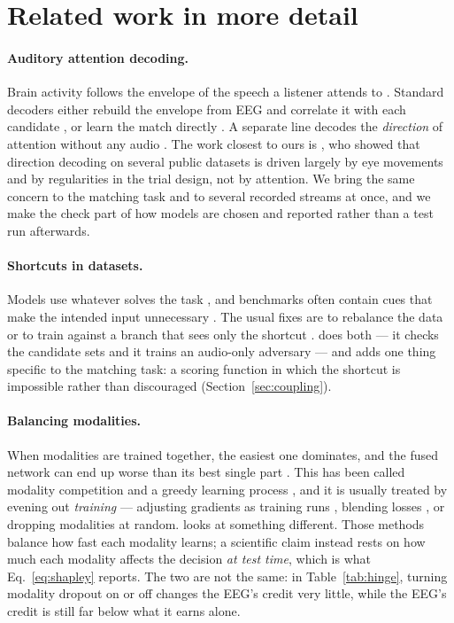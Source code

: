 \section{Related work in more detail}
\label{app:related}

\paragraph{Auditory attention decoding.}
Brain activity follows the envelope of the speech a listener attends to
\citep{ding2012,lalor2009}. Standard decoders either rebuild the envelope from
EEG and correlate it with each candidate \citep{osullivan2015}, or learn the
match directly \citep{accou2021,monesi2020,accou2023,puffay2023}. A separate line
decodes the \emph{direction} of attention without any audio
\citep{vandecappelle2021}. The work closest to ours is \citet{rotaru2024}, who
showed that direction decoding on several public datasets is driven largely by
eye movements and by regularities in the trial design, not by attention. We bring
the same concern to the matching task and to several recorded streams at once,
and we make the check part of how models are chosen and reported rather than a
test run afterwards.

\paragraph{Shortcuts in datasets.}
Models use whatever solves the task \citep{geirhos2020}, and benchmarks often
contain cues that make the intended input unnecessary
\citep{torralba2011,gururangan2018,goyal2017vqa}. The usual fixes are to rebalance
the data \citep{goyal2017vqa} or to train against a branch that sees only the
shortcut \citep{cadene2019rubi}. \merit{} does both --- it checks the candidate
sets and it trains an audio-only adversary \citep{ganin2015} --- and adds one thing
specific to the matching task: a scoring function in which the shortcut is
impossible rather than discouraged (Section~\ref{sec:coupling}).

\paragraph{Balancing modalities.}
When modalities are trained together, the easiest one dominates, and the fused
network can end up worse than its best single part \citep{wang2020gradblend}.
This has been called modality competition \citep{huang2022competition} and a
greedy learning process \citep{wu2022greedy}, and it is usually treated by
evening out \emph{training} --- adjusting gradients as training runs
\citep{peng2022ogm}, blending losses \citep{wang2020gradblend}, or dropping
modalities at random. \merit{} looks at something different. Those methods balance
how fast each modality learns; a scientific claim instead rests on how much each
modality affects the decision \emph{at test time}, which is what
Eq.~\ref{eq:shapley} reports. The two are not the same: in Table~\ref{tab:hinge},
turning modality dropout on or off changes the EEG's credit very little, while the
EEG's credit is still far below what it earns alone.

